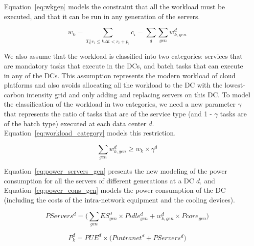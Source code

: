 Equation~\eqref{eq:wkgen} models the constraint that all the workload must be executed, and that it can be run in any generation of the servers.

\begin{equation} \label{eq:wkgen}
    w_k = \sum_{T_i|r_i\leq k\Delta t<r_i+p_i} c_i = \sum_d \sum_{gen} w_{k,gen}^d
\end{equation}

We also assume that the workload is classified into two categories: services that are mandatory tasks that execute in the DCs, and batch tasks that can execute in any of the DCs. This assumption represents the modern workload of cloud platforms and also avoids allocating all the workload to the DC with the lowest-carbon intensity grid and only adding and replacing servers on this DC. To model the classification of the workload in two categories, we need a new parameter $\gamma$ that represents the ratio of tasks that are of the service type (and 1 - $\gamma$ tasks are of the batch type) executed at each data center $d$. Equation~\eqref{eq:workload_category} models this restriction.

\begin{equation} \label{eq:workload_category}
 \sum_{gen}  w_{k,gen}^d \geq  w_k \times \gamma^d
\end{equation}


Equation~\eqref{eq:power_servers_gen} presents the new modeling of the power consumption for all the servers of different generations at a DC $d$, and Equation~\eqref{eq:power_cons_gen} models the power consumption of the DC (including the costs of the intra-network equipment and the cooling devices).


\begin{equation} \label{eq:power_servers_gen}
   PServers^d  =  \big(\sum_{gen} ES_{gen}^d \times  Pidle_{gen}^d + w^d_{k,gen}  \times  Pcore_{gen} \big)
\end{equation}


\begin{equation} \label{eq:power_cons_gen}
   P^d_k  = PUE^d \times \big(Pintranet^d + PServers^d\big)
\end{equation}


